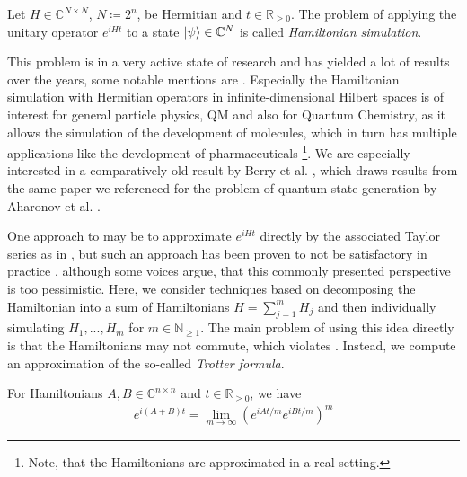 \begin{problem} \label{problem_hamiltonian_evolution}
    Let \(H \in \mathbb{C}^{N \times N}\), \(N \coloneqq 2^n\), be Hermitian and \(t \in \mathbb{R}_{\geq 0}\). The problem of applying the unitary operator \(e^{iHt}\) to a state \(\ket{\psi} \in \mathbb{C}^N\) is called \emph{Hamiltonian simulation}.
\end{problem}

This problem is in a very active state of research and has yielded a lot of results over the years, some notable mentions are \cite{Berry2015,Zhao2021}. Especially the Hamiltonian simulation with Hermitian operators in infinite-dimensional Hilbert spaces is of interest for general particle physics, QM and also for Quantum Chemistry, as it allows the simulation of the development of molecules, which in turn has multiple applications like the development of pharmaceuticals \cite[pp. 14-18]{Cao_2019}\footnote{Note, that the Hamiltonians are approximated in a real setting.}. We are especially interested in a comparatively old result by Berry et al. \cite{Berry2005}, which draws results from the same paper we referenced for the problem of quantum state generation by Aharonov et al. \cite{Aharonov2003}.

\phantom{}

One approach to  may be to approximate \(e^{iHt}\) directly by the associated Taylor series as in , but such an approach has been proven to not be satisfactory in practice \cite[p. 206]{Nielsen2010}, although some voices \cite[p. 1]{Zhao2021} argue, that this commonly presented perspective is too pessimistic. Here, we consider techniques based on decomposing the Hamiltonian into a sum of Hamiltonians \(H = \sum_{j=1}^m H_j\) and then individually simulating \(H_1, ..., H_m\) for \(m \in \mathbb{N}_{\geq 1}\). The main problem of using this idea directly is that the Hamiltonians may not commute, which violates . Instead, we compute an approximation of the so-called \emph{Trotter formula}.

\begin{theorem} \label{trotter_formula}
    For Hamiltonians \(A, B \in \mathbb{C}^{n \times n}\) and \(t \in \mathbb{R}_{\geq 0}\), we have
    \begin{align}
        e^{i(A+B)t} = \lim_{m \to \infty} (e^{iAt/m}e^{iBt/m})^m
    \end{align}
\end{theorem}

